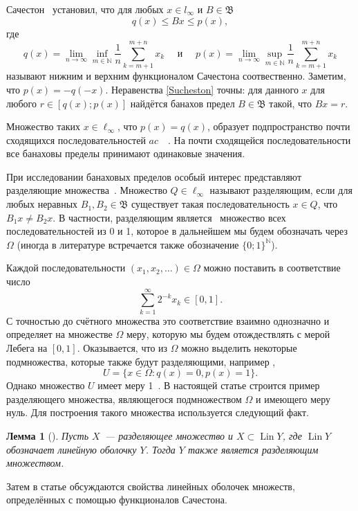\documentclass{article}
\theoremstyle{plain}
\newtheorem{lemma}{Лемма}
\theoremstyle{definition}
\begin{document}
\begin{fulltext}
Сачестон~\cite{sucheston1967banach} установил, что
для любых $x\in l_\infty$ и $B\in\mathfrak{B}$
\begin{equation}\label{Sucheston}
	q(x) \leqslant Bx \leqslant p(x)
	,
\end{equation}
где
\begin{equation*}
	q(x) = \lim_{n\to\infty} \inf_{m\in\mathbb{N}}  \frac{1}{n} \sum_{k=m+1}^{m+n} x_k
	\mbox{~~~~и~~~~}
	p(x) = \lim_{n\to\infty} \sup_{m\in\mathbb{N}}  \frac{1}{n} \sum_{k=m+1}^{m+n} x_k
\end{equation*}
называют нижним и верхним функционалом Сачестона соотвественно.
Заметим, что $p(x) = -q(-x)$.
Неравенства \eqref{Sucheston} точны:
для данного $x$ для любого $r\in[q(x); p(x)]$ найдётся банахов предел
$B\in\mathfrak{B}$ такой, что $Bx = r$.

Множество таких $x\in\ell_\infty$, что $p(x)=q(x)$,
образует подпространство почти сходящихся последовательностей $ac$~~\cite{lorentz1948contribution}.
На почти сходящейся последовательности все банаховы пределы принимают одинаковые значения.

При исследовании банаховых пределов особый интерес представляют разделяющие множества~\cite[\S 3]{Semenov2014geomprops}.
Множество $Q\in\ell_\infty$ называют разделяющим, если
для любых неравных $B_1, B_2\in\mathfrak{B}$ существует такая последовательность $x\in Q$,
что $B_1 x \neq B_2 x$.
В частности, разделяющим является~\cite{semenov2010characteristic} множество всех последовательностей из 0 и 1,
которое в дальнейшем мы будем обозначать через $\Omega$
(иногда в литературе встречается также обозначение $\{0;1\}^\mathbb{N}$).

Каждой последовательности $(x_1, x_2, \dots)\in \Omega$ можно поставить в соответствие число
\begin{equation}\label{eq:bijection_omega_0_1}
	\sum_{k=1}^\infty 2^{-k} x_k \in [0,1]
	.
\end{equation}
С точностью до счётного множества это соответствие взаимно однозначно и определяет на множестве $\Omega$ меру,
которую мы будем отождествлять с мерой Лебега на $[0,1]$.
%
Оказывается, что из $\Omega$ можно выделить некоторые подмножества, которые также будут разделяющими,
например \cite[\S 3, Теорема 11]{Semenov2014geomprops},
\begin{equation}
	U = \{ x\in\Omega: q(x) = 0, p(x) = 1 \}
	.
\end{equation}
Однако множество $U$ имеет меру 1~\cite{semenov2010characteristic}.
В настоящей статье строится пример разделяющего множества,
являющегося подмножеством $\Omega$ и имеющего меру нуль.
Для построения такого множества используется следующий факт.
%
\begin{lemma}[{\cite[\S 3, замечание 6]{Semenov2014geomprops}}]
	Пусть $X$~--- разделяющее множество и $X \subset \operatorname{Lin} Y$,
	где $\operatorname{Lin} Y$ обозначает линейную оболочку $Y$.
	Тогда $Y$ также является разделяющим множеством.
\end{lemma}
Затем в статье обсуждаются свойства линейных оболочек множеств, определённых с помощью функционалов Сачестона.


\end{fulltext}
\end{document}
